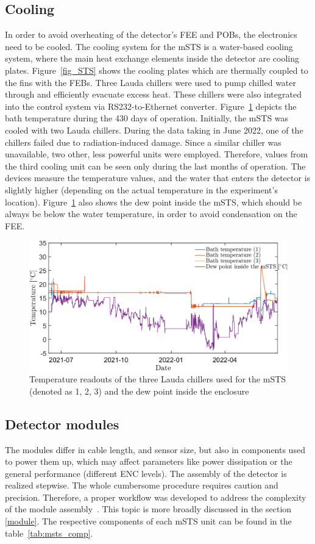 \subsection{Cooling}
\label{msts_cooling}
In order to avoid overheating of the detector's \gls{FEE} and \glspl{POB}, the electronics need to be cooled. The cooling system for the \gls{mSTS} is a water-based cooling system, where the main heat exchange elements inside the detector are cooling plates.  Figure~\ref{fig_STS} shows the cooling plates which are thermally coupled to the fins with the \glspl{FEB}. Three Lauda chillers were used to pump chilled water through and efficiently evacuate excess heat. These chillers were also integrated into the control system via RS232-to-Ethernet converter. Figure~\ref{fig_cooling} depicts the bath temperature during the 430 days of operation. Initially, the \gls{mSTS} was cooled with two Lauda chillers. During the data taking in June 2022, one of the chillers failed due to radiation-induced damage. Since a similar chiller was unavailable, two other, less powerful units were employed. Therefore, values from the third cooling unit can be seen only during the last months of operation. The devices measure the temperature values, and the water that enters the detector is slightly higher (depending on the actual temperature in the experiment's location). Figure~\ref{fig_cooling} also shows the dew point inside the \gls{mSTS}, which should be always be below the water temperature, in order to avoid condensation on the \gls{FEE}.

\begin{figure}[!h]
\centering
\includegraphics[width=0.95\columnwidth]{Chapter6/DCS/images/cooling.png}
\caption{Temperature readouts of the three Lauda chillers used for the \gls{mSTS} (denoted as 1, 2, 3) and the dew point inside the enclosure}
\label{fig_cooling}
\end{figure}
\newpage
\subsection{Detector modules}
 The modules differ in cable length, and sensor size, but also in components used to power them up, which may affect parameters like power dissipation or the general performance (different ENC levels).  The assembly of the detector is realized stepwise. The whole cumbersome procedure requires caution and precision. Therefore, a proper workflow was developed to address the complexity of the module assembly~\cite{carmen2}. This topic is more broadly discussed in the section \ref{module}. The respective components of each \gls{mSTS} unit can be found in the table~\ref{tab:msts_comp}. 

